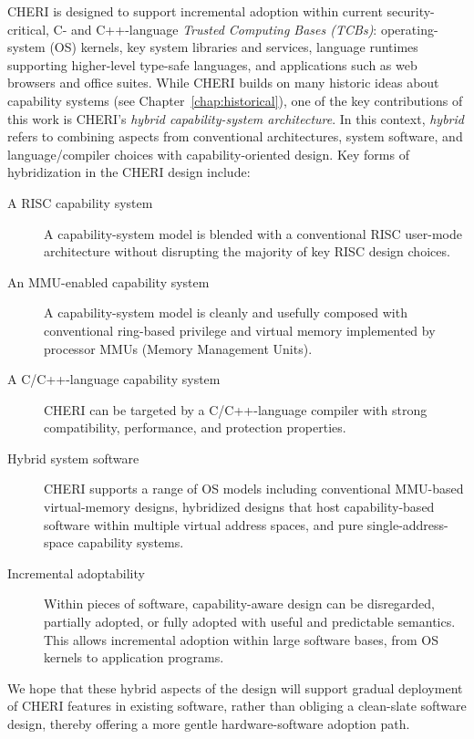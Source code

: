 CHERI is designed to support incremental adoption within current
security-critical, C- and C++-language \textit{Trusted Computing Bases (TCBs)}:
operating-system (OS) kernels, key system libraries and services, language
runtimes supporting higher-level type-safe languages, and applications such as
web browsers and office suites.
While CHERI builds on many historic ideas about capability systems (see
Chapter~\ref{chap:historical}), one of the key contributions of this work is
CHERI's \textit{hybrid capability-system architecture}.
In this context, \textit{hybrid} refers to combining aspects from conventional
architectures, system software, and language/compiler choices with
capability-oriented design.
Key forms of hybridization in the CHERI design include:

\begin{description}
\item[A RISC capability system] A capability-system model is blended with a
  conventional RISC user-mode architecture without disrupting the majority of
  key RISC design choices.

\item[An MMU-enabled capability system] A capability-system model is cleanly
  and usefully composed with conventional ring-based privilege and
  virtual memory implemented by processor MMUs (Memory Management Units).

\item[A C/C++-language capability system] CHERI can be targeted by a
  C/C++-language compiler with strong compatibility, performance, and
  protection properties.

\item[Hybrid system software] CHERI supports a range of OS models including
  conventional MMU-based virtual-memory designs, hybridized designs that
  host capability-based software within multiple virtual address spaces, and
  pure single-address-space capability systems.

\item[Incremental adoptability] Within pieces of software, capability-aware
  design can be disregarded, partially adopted, or fully adopted with useful
  and predictable semantics.
  This allows incremental adoption within large software bases, from OS
  kernels to application programs.
\end{description}

We hope that these hybrid aspects of the design will support gradual
deployment of CHERI features in existing software, rather than obliging a
clean-slate software design, thereby offering a more gentle hardware-software
adoption path.

